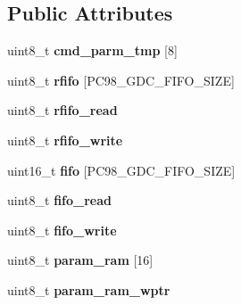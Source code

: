 \subsection*{Public Attributes}
\begin{DoxyCompactItemize}
\item 
\hypertarget{structPC98__GDC__state_ad53f1416505372b98977b8648c0b343b}{uint8\-\_\-t {\bfseries cmd\-\_\-parm\-\_\-tmp} \mbox{[}8\mbox{]}}\label{structPC98__GDC__state_ad53f1416505372b98977b8648c0b343b}

\item 
\hypertarget{structPC98__GDC__state_ad75c87326eb9d59df669ce4b7ea1100f}{uint8\-\_\-t {\bfseries rfifo} \mbox{[}P\-C98\-\_\-\-G\-D\-C\-\_\-\-F\-I\-F\-O\-\_\-\-S\-I\-Z\-E\mbox{]}}\label{structPC98__GDC__state_ad75c87326eb9d59df669ce4b7ea1100f}

\item 
\hypertarget{structPC98__GDC__state_aaa41b9c1f0b095f406aa564819aff26e}{uint8\-\_\-t {\bfseries rfifo\-\_\-read}}\label{structPC98__GDC__state_aaa41b9c1f0b095f406aa564819aff26e}

\item 
\hypertarget{structPC98__GDC__state_abfd13e784549ab4f9c859e1034ee41be}{uint8\-\_\-t {\bfseries rfifo\-\_\-write}}\label{structPC98__GDC__state_abfd13e784549ab4f9c859e1034ee41be}

\item 
\hypertarget{structPC98__GDC__state_ad64a8fd6f8d03081289691c29f96ded2}{uint16\-\_\-t {\bfseries fifo} \mbox{[}P\-C98\-\_\-\-G\-D\-C\-\_\-\-F\-I\-F\-O\-\_\-\-S\-I\-Z\-E\mbox{]}}\label{structPC98__GDC__state_ad64a8fd6f8d03081289691c29f96ded2}

\item 
\hypertarget{structPC98__GDC__state_a0829cda4d6f604233d94412231b1278c}{uint8\-\_\-t {\bfseries fifo\-\_\-read}}\label{structPC98__GDC__state_a0829cda4d6f604233d94412231b1278c}

\item 
\hypertarget{structPC98__GDC__state_a7d5646ae4fd268954e381dba35ac65d8}{uint8\-\_\-t {\bfseries fifo\-\_\-write}}\label{structPC98__GDC__state_a7d5646ae4fd268954e381dba35ac65d8}

\item 
\hypertarget{structPC98__GDC__state_a751d643e886af813597e85c821d9f8fd}{uint8\-\_\-t {\bfseries param\-\_\-ram} \mbox{[}16\mbox{]}}\label{structPC98__GDC__state_a751d643e886af813597e85c821d9f8fd}

\item 
\hypertarget{structPC98__GDC__state_ad0af657355ec1875c72313f3e24841d4}{uint8\-\_\-t {\bfseries param\-\_\-ram\-\_\-wptr}}\label{structPC98__GDC__state_ad0af657355ec1875c72313f3e24841d4}


\end{DoxyCompactItemize}
